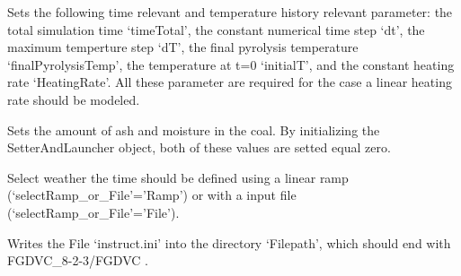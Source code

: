 \documentclass[letterpaper,10pt,english]{sphinxmanual}
\begin{document}
\begin{fulllineitems}

\begin{fulllineitems}
\label{FGDVCClasses:FGDVC_Fit_lin_regr.SetterAndLauncher.set7Ramp}
Sets the following time relevant and temperature history relevant parameter: the total simulation time `timeTotal', the constant numerical time step `dt', the maximum temperture step `dT', the final pyrolysis temperature `finalPyrolysisTemp', the temperature at t=0 `initialT', and the constant heating rate `HeatingRate'. All these parameter are required for the case a linear heating rate should be modeled.

\end{fulllineitems}


\begin{fulllineitems}
\label{FGDVCClasses:FGDVC_Fit_lin_regr.SetterAndLauncher.set9AshMoisture}
Sets the amount of ash and moisture in the coal. By initializing the SetterAndLauncher object, both of these values are setted equal zero.

\end{fulllineitems}


\begin{fulllineitems}
\label{FGDVCClasses:FGDVC_Fit_lin_regr.SetterAndLauncher.setTRamp_or_TFile}
Select weather the time should be defined using a linear ramp (`selectRamp\_or\_File'='Ramp') or with a input file (`selectRamp\_or\_File'='File').

\end{fulllineitems}


\begin{fulllineitems}
\label{FGDVCClasses:FGDVC_Fit_lin_regr.SetterAndLauncher.writeInstructFile}
Writes the File `instruct.ini' into the directory `Filepath', which should end with FGDVC\_8-2-3/FGDVC .

\end{fulllineitems}


\end{fulllineitems}
\end{document}
